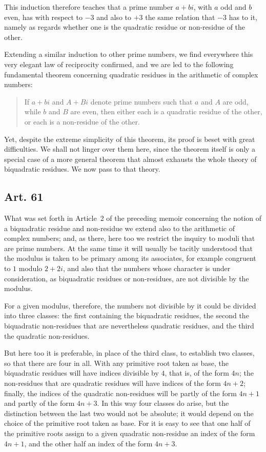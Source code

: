 \documentclass[12pt]{article}
\newcommand{\art}[1]{\subsection*{Art. #1}}
\begin{document}
This induction therefore teaches that a prime number $a+bi$, with $a$ odd and $b$ even, has with respect to $-3$ and also to $+3$ the same relation that $-3$ has to it, namely as regards whether one is the quadratic residue or non-residue of the other.

Extending a similar induction to other prime numbers, we find everywhere this very elegant law of reciprocity confirmed, and we are led to the following fundamental theorem concerning quadratic residues in the arithmetic of complex numbers:

\begin{quote}
If $a+bi$ and $A+Bi$ denote prime numbers such that $a$ and $A$ are odd, while $b$ and $B$ are even, then either each is a quadratic residue of the other, or each is a non-residue of the other.
\end{quote}
Yet, despite the extreme simplicity of this theorem, its proof is beset with great difficulties. We shall not linger over them here, since the theorem itself is only a special case of a more general theorem that almost exhausts the whole theory of biquadratic residues. We now pass to that theory.

\art{61}
What was set forth in Article~2 of the preceding memoir concerning the notion of a biquadratic residue and non-residue we extend also to the arithmetic of complex numbers; and, as there, here too we restrict the inquiry to moduli that are prime numbers. At the same time it will usually be tacitly understood that the modulus is taken to be primary among its associates, for example congruent to $1$ modulo $2+2i$, and also that the numbers whose character is under consideration, as biquadratic residues or non-residues, are not divisible by the modulus.

For a given modulus, therefore, the numbers not divisible by it could be divided into three classes: the first containing the biquadratic residues, the second the biquadratic non-residues that are nevertheless quadratic residues, and the third the quadratic non-residues.

But here too it is preferable, in place of the third class, to establish two classes, so that there are four in all. With any primitive root taken as base, the biquadratic residues will have indices divisible by $4$, that is, of the form $4n$; the non-residues that are quadratic residues will have indices of the form $4n+2$; finally, the indices of the quadratic non-residues will be partly of the form $4n+1$ and partly of the form $4n+3$. In this way four classes do arise, but the distinction between the last two would not be absolute; it would depend on the choice of the primitive root taken as base. For it is easy to see that one half of the primitive roots assign to a given quadratic non-residue an index of the form $4n+1$, and the other half an index of the form $4n+3$.
\end{document}

